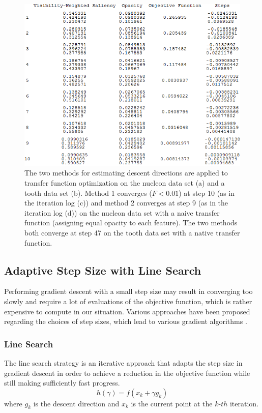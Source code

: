 \begin{figure}
\begin{minipage}{.49\textwidth}
		\subcaption{}	
	\end{minipage}~
	\begin{minipage}{.49\textwidth}
		\includegraphics[width=1\linewidth]{images/nucleon_naive_table_newton}
		\subcaption{}	
	\end{minipage}
	\caption{The two methods for estimating descent directions are applied to transfer function optimization on the nucleon data set (a) and a tooth data set (b).
		Method 1 converges ($F<0.01$) at step 10 (as in the iteration log (c)) and method 2 converges at step 9 (as in the iteration log (d)) on the nucleon data set with a naive transfer function (assigning equal opacity to each feature).
		The two methods both converge at step 47 on the tooth data set with a native transfer function.}
	\label{fig:nucleon_naive_tooth_naive_rms}
\end{figure}

\subsection{Adaptive Step Size with Line Search}
Performing gradient descent with a small step size may result in converging too slowly and require a lot of evaluations of the objective function, which is rather expensive to compute in our situation. Various approaches have been proposed regarding the choices of step sizes, which lead to various gradient algorithms \cite{yuan_step-sizes_2008}.

\subsubsection{Line Search}
The line search strategy is an iterative approach that adapts the step size in gradient descent in order to achieve a reduction in the objective function while still making sufficiently fast progress.
\[ h( \gamma)=f(x_{k}+\gamma g_{k}) \]
where $ g_{k} $ is the descent direction and $ x_{k} $ is the current point at the $ k$-$th $ iteration.

